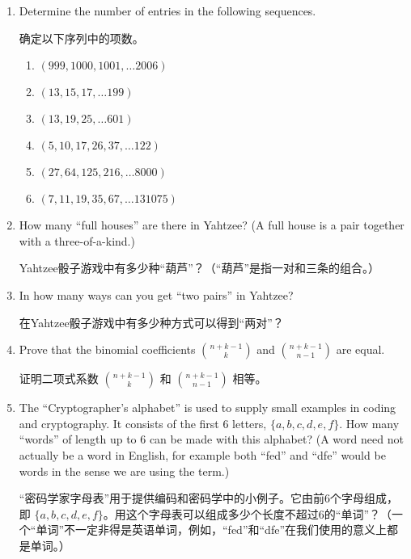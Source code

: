 \begin{enumerate}
  \item Determine the number of entries in the following sequences.
  
  \noindent 确定以下序列中的项数。
  \begin{enumerate}
    \item \wbitemsep $(999, 1000, 1001, \ldots  2006)$
    \item \wbitemsep $(13, 15, 17, \ldots 199)$
    \item \wbitemsep $(13, 19, 25, \ldots 601)$
    \item \wbitemsep $(5, 10, 17, 26, 37, \ldots 122)$
    \item \wbitemsep $(27, 64, 125, 216, \ldots 8000)$
    \item \wbitemsep $(7, 11, 19, 35, 67, \ldots 131075)$
    \end{enumerate}
  
  \workbookpagebreak
  
  \item How many ``full houses'' are there in Yahtzee? (A full house is a pair
  together with a three-of-a-kind.)
  
  \noindent Yahtzee骰子游戏中有多少种“葫芦”？（“葫芦”是指一对和三条的组合。）
  
  \wbvfill
  
  \item In how many ways can you get ``two pairs'' in Yahtzee?
  
  \noindent 在Yahtzee骰子游戏中有多少种方式可以得到“两对”？
  \wbvfill
  
  \item Prove that the binomial coefficients $\displaystyle \binom{n+k-1}{k}$
  and $\displaystyle \binom{n+k-1}{n-1}$ are equal.
  
  \noindent 证明二项式系数 $\displaystyle \binom{n+k-1}{k}$ 和 $\displaystyle \binom{n+k-1}{n-1}$ 相等。
  \wbvfill
  
  \workbookpagebreak
  
  \item The ``Cryptographer's alphabet'' is used to supply small examples
  in coding and cryptography. It consists of the first 6 letters, $\{a, b, c, d, e, f\}$. How many ``words'' of length up to 6 can be made with this 
  alphabet? (A word need not actually be a word in English, for example 
  both ``fed'' and ``dfe'' would be words in the sense we are using the term.)
  
  \noindent “密码学家字母表”用于提供编码和密码学中的小例子。它由前6个字母组成，即 $\{a, b, c, d, e, f\}$。用这个字母表可以组成多少个长度不超过6的“单词”？（一个“单词”不一定非得是英语单词，例如，“fed”和“dfe”在我们使用的意义上都是单词。）
  

\end{enumerate}
